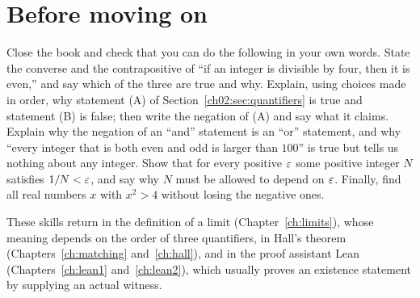 \section*{Before moving on}
Close the book and check that you can do the following in your own words. State the converse and the contrapositive of ``if an integer is divisible by four, then it is even,'' and say which of the three are true and why. Explain, using choices made in order, why statement (A) of Section~\ref{ch02:sec:quantifiers} is true and statement (B) is false; then write the negation of (A) and say what it claims. Explain why the negation of an ``and'' statement is an ``or'' statement, and why ``every integer that is both even and odd is larger than $100$'' is true but tells us nothing about any integer. Show that for every positive $\varepsilon$ some positive integer $N$ satisfies $1/N<\varepsilon$, and say why $N$ must be allowed to depend on $\varepsilon$. Finally, find all real numbers $x$ with $x^2>4$ without losing the negative ones.

These skills return in the definition of a limit (Chapter~\ref{ch:limits}), whose meaning depends on the order of three quantifiers, in Hall's theorem (Chapters~\ref{ch:matching} and~\ref{ch:hall}), and in the proof assistant Lean (Chapters~\ref{ch:lean1} and~\ref{ch:lean2}), which usually proves an existence statement by supplying an actual witness.
